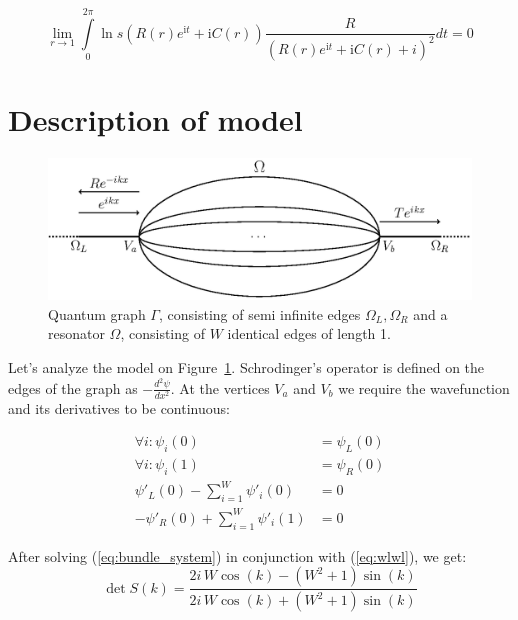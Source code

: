\documentclass{gCOV2e}
\theoremstyle{plain}%
\theoremstyle{definition}
\theoremstyle{remark}
\begin{document}
\begin{equation}\label{eq:critp}
\lim\limits_{r \to 1} \int\limits_{0}^{2 \pi} \ln s(R(r) e^{\mathrm{i} t} + \mathrm{i} C(r)) \frac{R}{(R(r) e^{\mathrm{i} t} + \mathrm{i} C(r) + i)^2} dt = 0
\end{equation}


\section{Description of model}

\begin{figure}[htbp]
\begin{center}
\includegraphics[trim=0 670 155 0,clip,width=\textwidth]{resonator_bundle.eps}
\caption{Quantum graph $\Gamma$, consisting of semi infinite edges $\Omega_L, \Omega_R$ 
and a resonator $\Omega$, consisting of $W$ identical edges of length 1.}
\label{fig:res_bundle}
\end{center}
\end{figure}


Let's analyze the model on Figure~\ref{fig:res_bundle}. Schrodinger's operator is defined on the edges of the graph as  $-\frac{d^2 \psi}{dx^2}$. At the vertices $V_a$ and $V_b$ we require the wavefunction and its derivatives to be continuous:

\begin{equation}\label{eq:bundle_system}
\begin{aligned}
   \forall i: \psi_i(0) &= \psi_L(0)
\\ \forall i: \psi_i(1) &= \psi_R(0)
\\ \psi'_L(0) - \sum\limits_{i = 1}^W \psi'_i(0) &= 0
\\ -\psi'_R(0) + \sum\limits_{i = 1}^W \psi'_i(1) &= 0
\end{aligned}
\end{equation}

After solving (\ref{eq:bundle_system}) in conjunction with (\ref{eq:wlwl}), we get:
\begin{equation*}
\det S(k) = \frac{2 i \, W \cos\left(k\right) - {\left(W^{2} + 1\right)} \sin\left(k\right)}{2 i \, W \cos\left(k\right) + {\left(W^{2} + 1\right)} \sin\left(k\right)}
\end{equation*}
\end{document}
